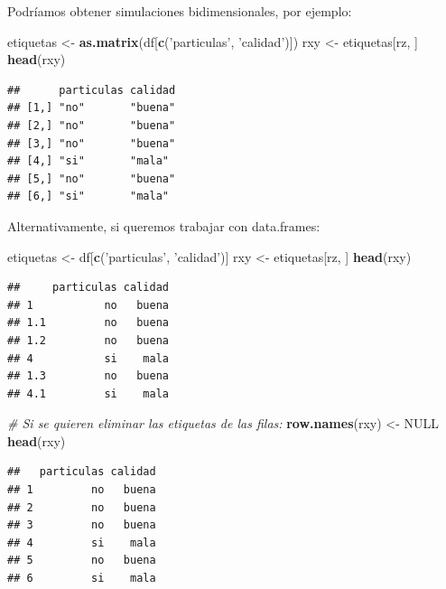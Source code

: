 \documentclass[]{book}
\newenvironment{Shaded}{\begin{snugshade}}{\end{snugshade}}
\newcommand{\KeywordTok}[1]{\textcolor[rgb]{0.13,0.29,0.53}{\textbf{#1}}}
\newcommand{\StringTok}[1]{\textcolor[rgb]{0.31,0.60,0.02}{#1}}
\newcommand{\CommentTok}[1]{\textcolor[rgb]{0.56,0.35,0.01}{\textit{#1}}}
\newcommand{\OtherTok}[1]{\textcolor[rgb]{0.56,0.35,0.01}{#1}}
\newcommand{\NormalTok}[1]{#1}
\theoremstyle{definition}
\theoremstyle{definition}
\theoremstyle{definition}
\theoremstyle{remark}
\begin{document}
Podríamos obtener simulaciones bidimensionales, por ejemplo:

\begin{Shaded}
\begin{Highlighting}[]
\NormalTok{etiquetas <-}\StringTok{ }\KeywordTok{as.matrix}\NormalTok{(df[}\KeywordTok{c}\NormalTok{(}\StringTok{'particulas'}\NormalTok{, }\StringTok{'calidad'}\NormalTok{)])}
\NormalTok{rxy <-}\StringTok{ }\NormalTok{etiquetas[rz, ]}
\KeywordTok{head}\NormalTok{(rxy)}
\end{Highlighting}
\end{Shaded}

\begin{verbatim}
##      particulas calidad
## [1,] "no"       "buena"
## [2,] "no"       "buena"
## [3,] "no"       "buena"
## [4,] "si"       "mala" 
## [5,] "no"       "buena"
## [6,] "si"       "mala"
\end{verbatim}

Alternativamente, si queremos trabajar con data.frames:

\begin{Shaded}
\begin{Highlighting}[]
\NormalTok{etiquetas <-}\StringTok{ }\NormalTok{df[}\KeywordTok{c}\NormalTok{(}\StringTok{'particulas'}\NormalTok{, }\StringTok{'calidad'}\NormalTok{)]}
\NormalTok{rxy <-}\StringTok{ }\NormalTok{etiquetas[rz, ]}
\KeywordTok{head}\NormalTok{(rxy)}
\end{Highlighting}
\end{Shaded}

\begin{verbatim}
##     particulas calidad
## 1           no   buena
## 1.1         no   buena
## 1.2         no   buena
## 4           si    mala
## 1.3         no   buena
## 4.1         si    mala
\end{verbatim}

\begin{Shaded}
\begin{Highlighting}[]
\CommentTok{# Si se quieren eliminar las etiquetas de las filas:}
\KeywordTok{row.names}\NormalTok{(rxy) <-}\StringTok{ }\OtherTok{NULL}
\KeywordTok{head}\NormalTok{(rxy)}
\end{Highlighting}
\end{Shaded}

\begin{verbatim}
##   particulas calidad
## 1         no   buena
## 2         no   buena
## 3         no   buena
## 4         si    mala
## 5         no   buena
## 6         si    mala
\end{verbatim}
\end{document}
